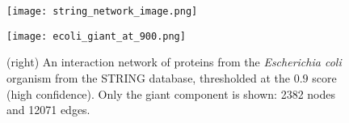 \begin{savenotes}
    \begin{figure}
        \begin{minipage}{.48\textwidth}
            \centering
            \texttt{[image: string\_network\_image.png]}
            \caption[Protein-protein interaction network visualised by the STRING database~\cite{Szklarczyk2019}.
            Edge thickness indicates the overall confidence score, i.e. the strength of data support.]%
            {Protein-protein interaction network visualised\protect\footnotemark{} by the STRING database~\cite{Szklarczyk2019}.
            Edge thickness indicates the overall confidence score, i.e. the strength of data support.}
            \label{fig:string_network_image}
        \end{minipage}\hfill%
        \begin{minipage}{.48\textwidth}
            \centering
            \vspace*{-6mm}
            \texttt{[image: ecoli\_giant\_at\_900.png]}
        \end{minipage}
        \caption{(right) An interaction network of proteins from the \textit{Escherichia coli} organism from the STRING database, thresholded at the $0.9$ score (high confidence). Only the giant component is shown: 2382 nodes and 12071 edges.}
        \label{fig:ecoli_giant_at_900}
    \end{figure}
\end{savenotes}
